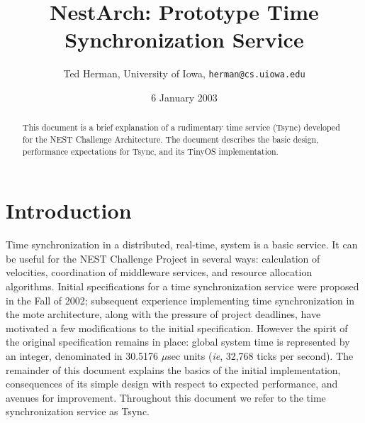 \documentclass[11pt]{article}
\def\Tsync{\textsf{Tsync}}
\begin{document}
\title{NestArch: Prototype Time Synchronization Service}
\author{Ted Herman, University of Iowa, \texttt{herman@cs.uiowa.edu}}
\date{6 January 2003}
\maketitle
\begin{abstract}
This document is a brief explanation of a rudimentary time
service (\Tsync) developed for the NEST Challenge Architecture.  The 
document describes the basic design, performance expectations for
\Tsync, and its TinyOS implementation.
\end{abstract}

\section{Introduction}

Time synchronization in a distributed, real-time, system is a 
basic service.  It can be useful for the NEST Challenge Project in
several ways: calculation of velocities, coordination of 
middleware services, and resource allocation algorithms.  Initial
specifications for a time synchronization service were proposed in
the Fall of 2002;  subsequent experience implementing time 
synchronization in the mote architecture, along with the pressure
of project deadlines, have motivated a few modifications to the
initial specification.  However the spirit of the original
specification remains in place:  global system time is represented
by an integer, denominated in 30.5176 $\mu$sec units 
(\emph{ie}, 32,768 ticks per second).  The remainder of this
document explains the basics of the initial implementation, 
consequences of its simple design with respect to expected 
performance, and avenues for improvement.  Throughout this document
we refer to the time synchronization service as \Tsync.
\end{document}
